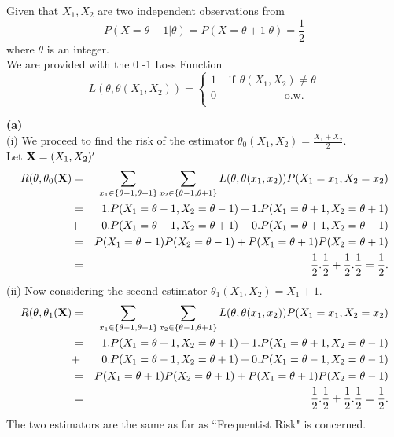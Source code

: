 \def\X   {\hbox{\bf X}}
\def\p   {\hbox{\bf p}}


Given that $X_1, X_2$ are two independent observations from
\begin{equation}
P(X=\theta-1|\theta)=P(X=\theta+1|\theta)=\frac{1}{2}
\end{equation}
where $\theta$ is an integer. \\
We are provided with the 0 -1 Loss Function
$$
L(\theta,\theta(X_1,X_2))=\left\{\begin{array}{c}
1\:\:\:\:\:\mbox{if}\:\:\theta(X_1,X_2)\neq \theta\\
0\:\:\:\:\:\:\:\:\:\:\:\:\:\:\:\:\:\:\:\:\:\:\:\:\:\:\:\:\mbox{o.w.}\\
\end{array}
\right.
$$

\noindent
\textbf{(a)} \\(i) We proceed to find the risk of the estimator $\theta_0(X_1,X_2)=\frac{X_1+X_2}{2}$. \\
Let $\X=(X_1,X_2)'$
\begin{eqnarray}
R(\theta,\theta_0(\X) &=& \sum_{x_1\in\{\theta-1,\theta+1\}}\sum_{x_2\in\{\theta-1,\theta+1\}}L(\theta,\theta(x_1,x_2))P(X_1=x_1,X_2=x_2)\nonumber\\
&=& 1. P(X_1=\theta-1,X_2=\theta-1)+1.P(X_1=\theta+1,X_2=\theta+1)\nonumber\\
&+& 0.P(X_1=\theta-1,X_2=\theta+1)+0.P(X_1=\theta+1,X_2=\theta-1)\nonumber\\
&=& P(X_1=\theta-1)P(X_2=\theta-1)+P(X_1=\theta+1)P(X_2=\theta+1)\nonumber\\
&=& \frac{1}{2}.\frac{1}{2}+\frac{1}{2}.\frac{1}{2}=\frac{1}{2}.
\end{eqnarray}
(ii) Now considering the second estimator $\theta_1(X_1,X_2)=X_1+1$.
\begin{eqnarray}
R(\theta,\theta_1(\X) &=& \sum_{x_1\in\{\theta-1,\theta+1\}}\sum_{x_2\in\{\theta-1,\theta+1\}}L(\theta,\theta(x_1,x_2))P(X_1=x_1,X_2=x_2)\nonumber\\
&=& 1. P(X_1=\theta+1,X_2=\theta+1)+1.P(X_1=\theta+1,X_2=\theta-1)\nonumber\\
&+& 0.P(X_1=\theta-1,X_2=\theta+1)+0.P(X_1=\theta-1,X_2=\theta-1)\nonumber\\
&=& P(X_1=\theta+1)P(X_2=\theta+1)+P(X_1=\theta+1)P(X_2=\theta-1)\nonumber\\
&=& \frac{1}{2}.\frac{1}{2}+\frac{1}{2}.\frac{1}{2}=\frac{1}{2}.
\end{eqnarray}
The two estimators are the same as far as ``Frequentist Risk" is concerned.\\


